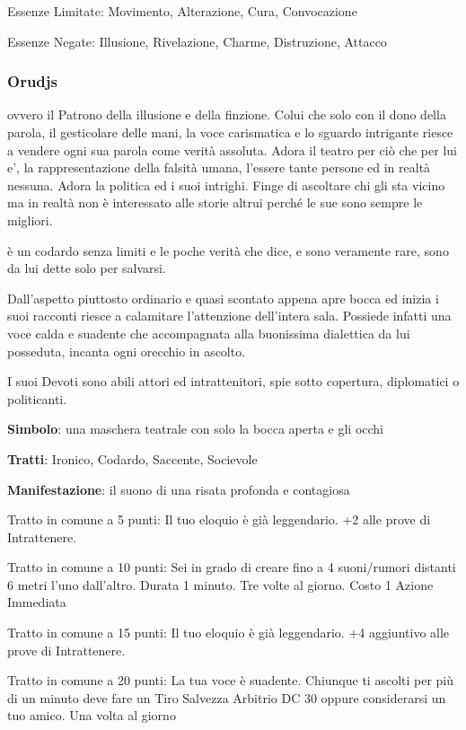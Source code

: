 \documentclass[a4paper,11pt,twoside,openany]{book}
\begin{document}
{Essenze Limitate: Movimento, Alterazione, Cura, Convocazione

Essenze Negate: Illusione, Rivelazione, Charme, Distruzione, Attacco

\subsubsection{Orudjs}

\label{orudjs}

ovvero il Patrono della illusione e della finzione. Colui che solo con il dono della parola, il gesticolare delle mani, la voce carismatica e lo sguardo intrigante riesce a vendere ogni sua parola come verità assoluta. Adora il teatro per ciò che per lui e', la rappresentazione della falsità umana, l'essere tante persone ed in realtà nessuna. Adora la politica ed i suoi intrighi. Finge di ascoltare chi gli sta vicino ma in realtà non è interessato alle storie altrui perché le sue sono sempre le migliori.

è un codardo senza limiti e le poche verità che dice, e sono veramente rare, sono da lui dette solo per salvarsi.

Dall'aspetto piuttosto ordinario e quasi scontato appena apre bocca ed inizia i suoi racconti riesce a calamitare l'attenzione dell'intera sala. Possiede infatti una voce calda e suadente che accompagnata alla buonissima dialettica da lui posseduta, incanta ogni orecchio in ascolto.

I suoi Devoti sono abili attori ed intrattenitori, spie sotto copertura, diplomatici o politicanti.

\textbf{Simbolo}: una maschera teatrale con solo la bocca aperta e
gli occhi

\textbf{Tratti}: Ironico, Codardo, Saccente, Socievole

\textbf{Manifestazione}: il suono di una risata profonda e contagiosa

\bigskip

Tratto in comune a 5 punti: Il tuo eloquio è già leggendario. +2 alle prove di Intrattenere.

Tratto in comune a 10 punti: Sei in grado di creare fino a 4 suoni/rumori distanti 6 metri l'uno dall'altro. Durata 1 minuto. Tre volte al giorno. Costo 1 Azione Immediata

Tratto in comune a 15 punti: Il tuo eloquio è già leggendario. +4 aggiuntivo alle prove di Intrattenere.

Tratto in comune a 20 punti: La tua voce è suadente. Chiunque ti ascolti per più di un minuto deve fare un Tiro Salvezza Arbitrio DC 30 oppure considerarsi un tuo amico. Una volta al giorno

}
\end{document}

